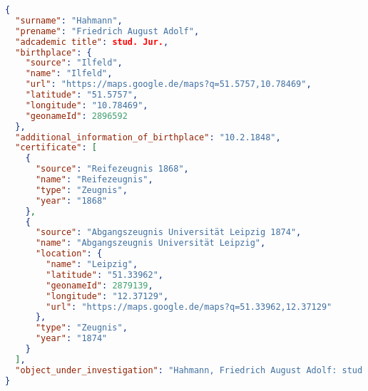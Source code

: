 \documentclass[12pt,a4paper]{article}
\begin{document}
\begin{footnotesize}

\enlargethispage{\baselineskip}
\begin{lstlisting}[language=JSON]
{
  "surname": "Hahmann",
  "prename": "Friedrich August Adolf",
  "adcademic title": stud. Jur.,
  "birthplace": {
    "source": "Ilfeld",
    "name": "Ilfeld",
    "url": "https://maps.google.de/maps?q=51.5757,10.78469",
    "latitude": "51.5757",
    "longitude": "10.78469",
    "geonameId": 2896592
  },
  "additional_information_of_birthplace": "10.2.1848",
  "certificate": [
    {
      "source": "Reifezeugnis 1868",
      "name": "Reifezeugnis",
      "type": "Zeugnis",
      "year": "1868"
    },
    {
      "source": "Abgangszeugnis Universität Leipzig 1874",
      "name": "Abgangszeugnis Universität Leipzig",
      "location": {
        "name": "Leipzig",
        "latitude": "51.33962",
        "geonameId": 2879139,
        "longitude": "12.37129",
        "url": "https://maps.google.de/maps?q=51.33962,12.37129"
      },
      "type": "Zeugnis",
      "year": "1874"
    }
  ],
  "object_under_investigation": "Hahmann, Friedrich August Adolf: stud. Jur., geb. Ilfeld 10.2.1848-- Reifezeugnis 1868, Abgangszeugnis Universität Leipzig 1874"
}
\end{lstlisting}

\end{footnotesize}

\end{document}
